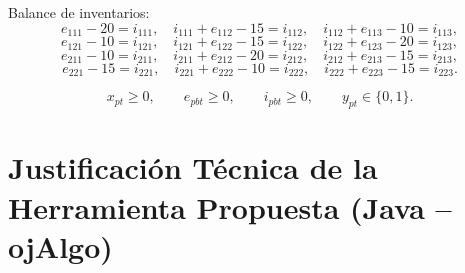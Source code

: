 \documentclass[12pt,a4paper]{article}
\begin{document}
Balance de inventarios:
\[
e_{111}-20=i_{111},\quad i_{111}+e_{112}-15=i_{112},\quad i_{112}+e_{113}-10=i_{113},
\]
\[
e_{121}-10=i_{121},\quad i_{121}+e_{122}-15=i_{122},\quad i_{122}+e_{123}-20=i_{123},
\]
\[
e_{211}-10=i_{211},\quad i_{211}+e_{212}-20=i_{212},\quad i_{212}+e_{213}-15=i_{213},
\]
\[
e_{221}-15=i_{221},\quad i_{221}+e_{222}-10=i_{222},\quad i_{222}+e_{223}-15=i_{223}.
\]

\[
x_{pt}\ge 0,\qquad e_{pbt}\ge 0,\qquad i_{pbt}\ge 0,\qquad y_{pt}\in\{0,1\}.
\]

\section{Justificación Técnica de la Herramienta Propuesta (Java -- ojAlgo)}

\small
\setlength{\LTpre}{0pt}
\setlength{\LTpost}{0pt}
\end{document}

